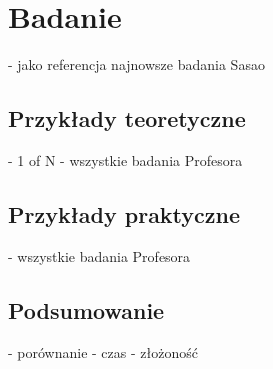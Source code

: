 \chapter{Badanie}
- jako referencja najnowsze badania Sasao
\section{Przykłady teoretyczne}
- 1 of N
- wszystkie badania Profesora
\section{Przykłady praktyczne}
- wszystkie badania Profesora
\section{Podsumowanie}
- porównanie
- czas
- złożoność
